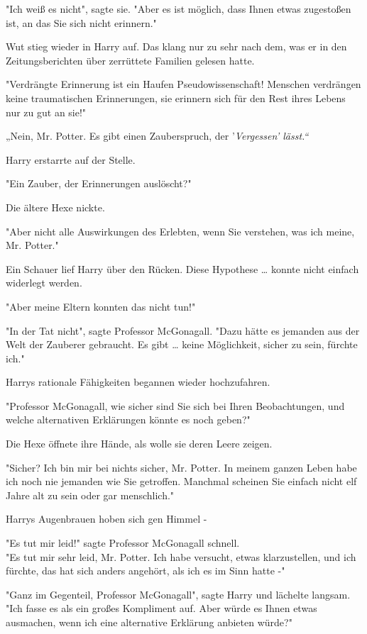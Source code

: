 {"Ich weiß es nicht", sagte sie. "Aber es ist möglich, dass Ihnen etwas zugestoßen ist, an das Sie sich nicht erinnern."

Wut stieg wieder in Harry auf. Das klang nur zu sehr nach dem, was er in den Zeitungsberichten über zerrüttete Familien gelesen hatte.

"Verdrängte Erinnerung ist ein Haufen Pseudowissenschaft! Menschen verdrängen keine traumatischen Erinnerungen, sie erinnern sich für den Rest ihres Lebens nur zu gut an sie!"

„Nein, Mr. Potter. Es gibt einen Zauberspruch, der '\emph{Vergessen' lässt.“}

Harry erstarrte auf der Stelle.

"Ein Zauber, der Erinnerungen auslöscht?"

Die ältere Hexe nickte.

"Aber nicht alle Auswirkungen des Erlebten, wenn Sie verstehen, was ich meine, Mr. Potter."

Ein Schauer lief Harry über den Rücken. Diese Hypothese … konnte nicht einfach widerlegt werden.

"Aber meine Eltern konnten das nicht tun!"

"In der Tat nicht", sagte Professor McGonagall. "Dazu hätte es jemanden aus der Welt der Zauberer gebraucht. Es gibt … keine Möglichkeit, sicher zu sein, fürchte ich."

Harrys rationale Fähigkeiten begannen wieder hochzufahren.

"Professor McGonagall, wie sicher sind Sie sich bei Ihren Beobachtungen, und welche alternativen Erklärungen könnte es noch geben?"

Die Hexe öffnete ihre Hände, als wolle sie deren Leere zeigen.

"Sicher? Ich bin mir bei nichts sicher, Mr. Potter. In meinem ganzen Leben habe ich noch nie jemanden wie Sie getroffen. Manchmal scheinen Sie einfach nicht elf Jahre alt zu sein oder gar menschlich."

Harrys Augenbrauen hoben sich gen Himmel -

"Es tut mir leid!" sagte Professor McGonagall schnell.\\ "Es tut mir sehr leid, Mr. Potter. Ich habe versucht, etwas klarzustellen, und ich fürchte, das hat sich anders angehört, als ich es im Sinn hatte -"

"Ganz im Gegenteil, Professor McGonagall", sagte Harry und lächelte langsam. "Ich fasse es als ein großes Kompliment auf. Aber würde es Ihnen etwas ausmachen, wenn ich eine alternative Erklärung anbieten würde?"

}
